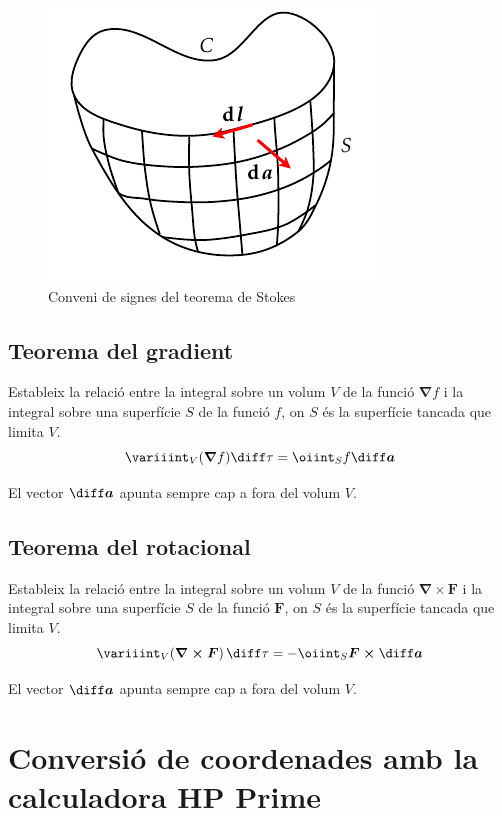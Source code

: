 \documentclass[catalan,a4paper,twoside,11pt]{article}
\begin{document}
\begin{figure}[h]
\centering
     \includegraphics{Imatges/Stokes.pdf}
\caption{Conveni de signes del teorema de Stokes}
\label{pic:signe-teo-stockes}
\end{figure}


\subsection{Teorema del gradient}
Estableix la relació entre la integral sobre un volum $V$ de la funció $\boldsymbol{\nabla}f$ i la integral sobre una superfície $S$ de la funció $f$, on $S$ és la superfície tancada que limita $V$.
\begin{equation}
    \variiint_V(\boldsymbol{\nabla}f)\diff \tau = \oiint_S f\boldsymbol{\diff a}
\end{equation}

El vector $\boldsymbol{\diff a}$ apunta sempre cap a fora del volum $V$.

\subsection{Teorema del rotacional}
Estableix la relació entre la integral sobre un volum $V$ de la funció $\boldsymbol{\nabla\times F}$ i la integral sobre una superfície $S$ de la funció $\boldsymbol{F}$, on $S$ és la superfície tancada que limita $V$.
\begin{equation}
    \variiint_V(\boldsymbol{\nabla\times F})\,\diff \tau=-\oiint_S
    \boldsymbol{F\times\diff a}
\end{equation}

El vector $\boldsymbol{\diff a}$ apunta sempre cap a fora del volum $V$.

\section{Conversió de coordenades amb la calculadora HP Prime}
\end{document}
